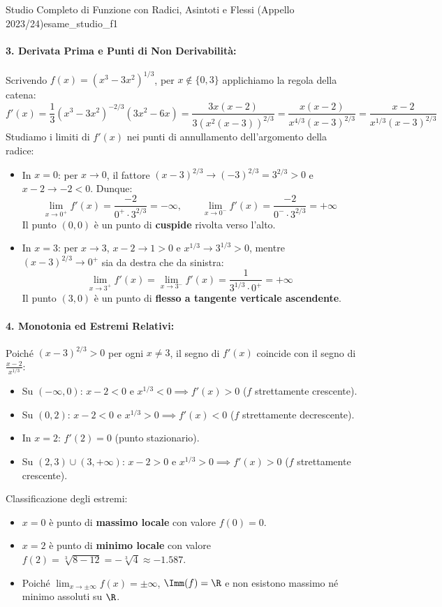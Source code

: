 \begin{esempio}{Studio Completo di Funzione con Radici, Asintoti e Flessi (Appello 2023/24)}{esame_studio_f1}
\paragraph{3. Derivata Prima e Punti di Non Derivabilità:}
Scrivendo $f(x) = (x^3 - 3x^2)^{1/3}$, per $x \notin \{0, 3\}$ applichiamo la regola della catena:
\[
    f'(x) = \frac{1}{3}(x^3 - 3x^2)^{-2/3} (3x^2 - 6x) = \frac{3x(x - 2)}{3 (x^2(x - 3))^{2/3}} = \frac{x(x - 2)}{x^{4/3}(x - 3)^{2/3}} = \frac{x - 2}{x^{1/3}(x - 3)^{2/3}}
\]
Studiamo i limiti di $f'(x)$ nei punti di annullamento dell'argomento della radice:
\begin{itemize}
    \item In $x = 0$: per $x \to 0$, il fattore $(x-3)^{2/3} \to (-3)^{2/3} = 3^{2/3} > 0$ e $x - 2 \to -2 < 0$. Dunque:
    \[
        \lim_{x \to 0^+} f'(x) = \frac{-2}{0^+ \cdot 3^{2/3}} = -\infty, \qquad \lim_{x \to 0^-} f'(x) = \frac{-2}{0^- \cdot 3^{2/3}} = +\infty
    \]
    Il punto $(0, 0)$ è un punto di \textbf{cuspide} rivolta verso l'alto.
    \item In $x = 3$: per $x \to 3$, $x - 2 \to 1 > 0$ e $x^{1/3} \to 3^{1/3} > 0$, mentre $(x-3)^{2/3} \to 0^+$ sia da destra che da sinistra:
    \[
        \lim_{x \to 3^+} f'(x) = \lim_{x \to 3^-} f'(x) = \frac{1}{3^{1/3} \cdot 0^+} = +\infty
    \]
    Il punto $(3, 0)$ è un punto di \textbf{flesso a tangente verticale ascendente}.
\end{itemize}

\paragraph{4. Monotonia ed Estremi Relativi:}
Poiché $(x-3)^{2/3} > 0$ per ogni $x \neq 3$, il segno di $f'(x)$ coincide con il segno di $\frac{x-2}{x^{1/3}}$:
\begin{itemize}
    \item Su $(-\infty, 0)$: $x - 2 < 0$ e $x^{1/3} < 0 \implies f'(x) > 0$ ($f$ strettamente crescente).
    \item Su $(0, 2)$: $x - 2 < 0$ e $x^{1/3} > 0 \implies f'(x) < 0$ ($f$ strettamente decrescente).
    \item In $x = 2$: $f'(2) = 0$ (punto stazionario).
    \item Su $(2, 3) \cup (3, +\infty)$: $x - 2 > 0$ e $x^{1/3} > 0 \implies f'(x) > 0$ ($f$ strettamente crescente).
\end{itemize}
Classificazione degli estremi:
\begin{itemize}
    \item $x = 0$ è punto di \textbf{massimo locale} con valore $f(0) = 0$.
    \item $x = 2$ è punto di \textbf{minimo locale} con valore $f(2) = \sqrt[3]{8 - 12} = -\sqrt[3]{4} \approx -1.587$.
    \item Poiché $\lim_{x \to \pm \infty} f(x) = \pm \infty$, $\Imm(f) = \R$ e non esistono massimo né minimo assoluti su $\R$.
\end{itemize}


\end{esempio}
